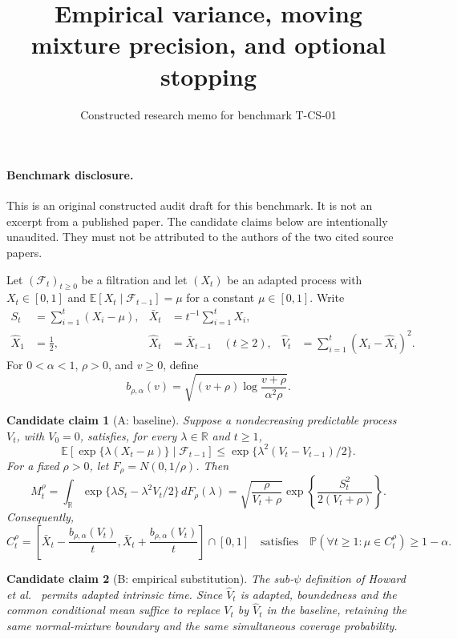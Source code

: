 \documentclass[11pt]{article}
\title{Empirical variance, moving mixture precision, and optional stopping}
\author{Constructed research memo for benchmark T-CS-01}
\date{}
\newtheorem{candidate}{Candidate claim}
\newcommand{\E}{\mathbb E}
\newcommand{\Prb}{\mathbb P}
\newcommand{\F}{\mathcal F}
\newcommand{\R}{\mathbb R}
\begin{document}
\maketitle
\paragraph{Benchmark disclosure.}
This is an original constructed audit draft for this benchmark. It is not an excerpt from a published paper. The candidate claims below are intentionally unaudited. They must not be attributed to the authors of the two cited source papers.

Let $(\F_t)_{t\geq 0}$ be a filtration and let $(X_t)$ be an adapted process with $X_t\in[0,1]$ and $\E[X_t\mid\F_{t-1}]=\mu$ for a constant $\mu\in[0,1]$. Write
\begin{align*}
S_t&=\sum_{i=1}^t(X_i-\mu), & \bar X_t&=t^{-1}\sum_{i=1}^tX_i,\\
\widehat X_1&=\tfrac12, & \widehat X_t&=\bar X_{t-1}\quad(t\geq2), &
\widehat V_t&=\sum_{i=1}^t(X_i-\widehat X_i)^2.
\end{align*}
For $0<\alpha<1$, $\rho>0$, and $v\geq0$, define
\begin{equation}\label{eq:normal-boundary}
b_{\rho,\alpha}(v)=\sqrt{(v+\rho)\log\frac{v+\rho}{\alpha^2\rho}}.
\end{equation}

\begin{candidate}[A: baseline]
Suppose a nondecreasing predictable process $V_t$, with $V_0=0$, satisfies, for every $\lambda\in\R$ and $t\geq1$,
\begin{equation}\label{eq:sg}
\E[\exp\{\lambda(X_t-\mu)\}\mid\F_{t-1}]
\leq\exp\{\lambda^2(V_t-V_{t-1})/2\}.
\end{equation}
For a fixed $\rho>0$, let $F_\rho=N(0,1/\rho)$. Then
\begin{equation}\label{eq:normal-mixture}
M_t^\rho=\int_{\R}\exp\{\lambda S_t-\lambda^2V_t/2\}\,dF_\rho(\lambda)
=\sqrt{\frac{\rho}{V_t+\rho}}\exp\left\{\frac{S_t^2}{2(V_t+\rho)}\right\}.
\end{equation}
Consequently,
\begin{equation}\label{eq:cs}
C_t^\rho=\left[\bar X_t-\frac{b_{\rho,\alpha}(V_t)}t,\bar X_t+\frac{b_{\rho,\alpha}(V_t)}t\right]\cap[0,1]
\quad\text{satisfies}\quad
\Prb(\forall t\geq1:\mu\in C_t^\rho)\geq1-\alpha.
\end{equation}
\end{candidate}

\begin{candidate}[B: empirical substitution]
The sub-$\psi$ definition of Howard et al.~\cite{H2020} permits adapted intrinsic time. Since $\widehat V_t$ is adapted, boundedness and the common conditional mean suffice to replace $V_t$ by $\widehat V_t$ in the baseline, retaining the same normal-mixture boundary and the same simultaneous coverage probability.
\end{candidate}
\end{document}

